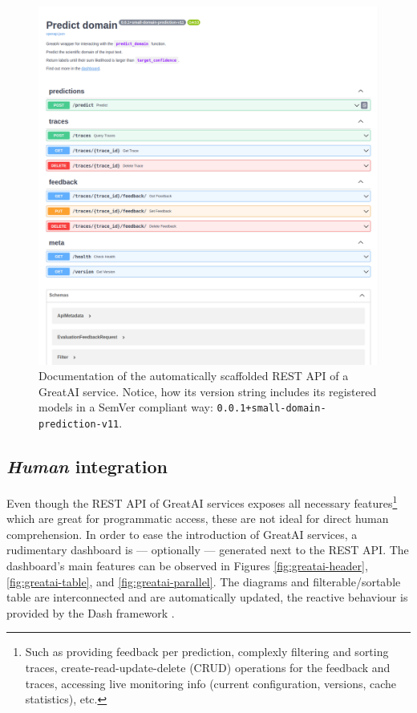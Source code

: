 \begin{figure}
    \centering
    \includegraphics[width=0.85\linewidth]{figures/greatai-api.png}
    \captionsetup{width=.9\linewidth}
    \caption{Documentation of the automatically scaffolded REST API of a GreatAI service. Notice, how its version string includes its registered models in a SemVer compliant way: \texttt{0.0.1+small-domain-prediction-v11}.}
    \label{fig:greatai-api}
\end{figure}

\subsection{\textit{Human} integration}

Even though the REST API of GreatAI services exposes all necessary features\footnote{Such as providing feedback per prediction, complexly filtering and sorting traces, create-read-update-delete (CRUD) operations for the feedback and traces, accessing live monitoring info (current configuration, versions, cache statistics), etc.} which are great for programmatic access, these are not ideal for direct human comprehension. In order to ease the introduction of GreatAI services, a rudimentary dashboard is --- optionally --- generated next to the REST API. The dashboard's main features can be observed in Figures \ref{fig:greatai-header}, \ref{fig:greatai-table}, and \ref{fig:greatai-parallel}. The diagrams and filterable/sortable table are interconnected and are automatically updated, the reactive behaviour is provided by the Dash framework \cite{shammamah_hossain-proc-scipy-2019}.

